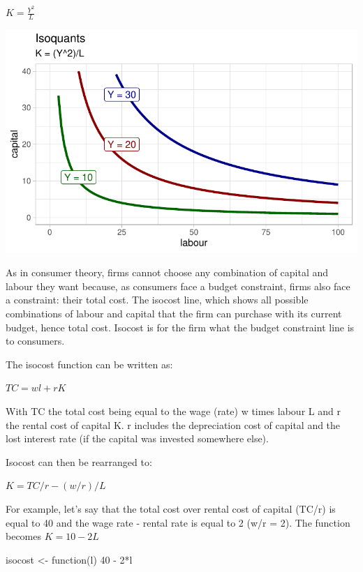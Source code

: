 \documentclass[
  letterpaper,
  DIV=11,
  numbers=noendperiod]{scrreprt}
\newenvironment{Shaded}{\begin{snugshade}}{\end{snugshade}}
\newcommand{\ControlFlowTok}[1]{\textcolor[rgb]{0.00,0.23,0.31}{#1}}
\newcommand{\DecValTok}[1]{\textcolor[rgb]{0.68,0.00,0.00}{#1}}
\newcommand{\NormalTok}[1]{\textcolor[rgb]{0.00,0.23,0.31}{#1}}
\newcommand{\OtherTok}[1]{\textcolor[rgb]{0.00,0.23,0.31}{#1}}
\newcommand{\SpecialCharTok}[1]{\textcolor[rgb]{0.37,0.37,0.37}{#1}}
\begin{document}
\(K = \frac{Y^{2}}{L}\)

\includegraphics{production-theory_files/figure-pdf/unnamed-chunk-8-1.pdf}

As in consumer theory, firms cannot choose any combination of capital
and labour they want because, as consumers face a budget constraint,
firms also face a constraint: their total cost. The isocost line, which
shows all possible combinations of labour and capital that the firm can
purchase with its current budget, hence total cost. Isocost is for the
firm what the budget constraint line is to consumers.

The isocost function can be written as:

\(TC = wl +rK\)

With TC the total cost being equal to the wage (rate) w times labour L
and r the rental cost of capital K. r includes the depreciation cost of
capital and the lost interest rate (if the capital was invested
somewhere else).

Isocost can then be rearranged to:

\(K = TC/r - (w/r)/L\)

For example, let's say that the total cost over rental cost of capital
(TC/r) is equal to 40 and the wage rate - rental rate is equal to 2 (w/r
= 2). The function becomes \(K = 10 - 2L\)

\begin{Shaded}
\begin{Highlighting}[]
\NormalTok{isocost }\OtherTok{\textless{}{-}} \ControlFlowTok{function}\NormalTok{(l) }\DecValTok{40} \SpecialCharTok{{-}} \DecValTok{2}\SpecialCharTok{*}\NormalTok{l}
\end{Highlighting}
\end{Shaded}
\end{document}
